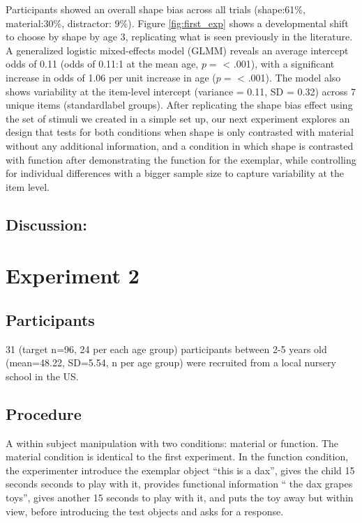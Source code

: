 \documentclass[10pt, letterpaper]{article}
\begin{document}
Participants showed an overall shape bias across all trials (shape:61\%,
material:30\%, distractor: 9\%). Figure \ref{fig:first_exp} shows a
developmental shift to choose by shape by age 3, replicating what is
seen previously in the literature.\\
A generalized logistic mixed-effects model (GLMM) reveals an average
intercept odds of 0.11 (odds of 0.11:1 at the mean age, \(p=\)
\textless{} .001), with a significant increase in odds of 1.06 per unit
increase in age (\(p=\) \textless{} .001). The model also shows
variability at the item-level intercept (variance = 0.11, SD = 0.32)
across 7 unique items (standardlabel groups). After replicating the
shape bias effect using the set of stimuli we created in a simple set
up, our next experiment explores an design that tests for both
conditions when shape is only contrasted with material without any
additional information, and a condition in which shape is contrasted
with function after demonstrating the function for the exemplar, while
controlling for individual differences with a bigger sample size to
capture variability at the item level.

\hypertarget{discussion}{%
\subsection{Discussion:}\label{discussion}}

\hypertarget{experiment-2}{%
\section{Experiment 2}\label{experiment-2}}

\hypertarget{participants-1}{%
\subsection{Participants}\label{participants-1}}

31 (target n=96, 24 per each age group) participants between 2-5 years
old (mean=48.22, SD=5.54, n per age group) were recruited from a local
nursery school in the US.

\hypertarget{procedure-1}{%
\subsection{Procedure}\label{procedure-1}}

A within subject manipulation with two conditions: material or function.
The material condition is identical to the first experiment. In the
function condition, the experimenter introduce the exemplar object
``this is a dax'', gives the child 15 seconds seconds to play with it,
provides functional information `` the dax grapes toys'', gives another
15 seconds to play with it, and puts the toy away but within view,
before introducing the test objects and asks for a response.
\end{document}
